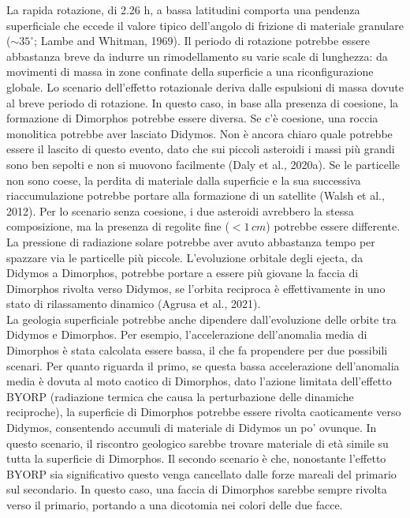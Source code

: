 \documentclass[a4paper,11pt,openright]{book}
\begin{document}
La rapida rotazione, di 2.26 h, a bassa latitudini comporta una pendenza superficiale che eccede il valore tipico dell'angolo di frizione di materiale granulare ($\sim 35^{\circ}$; Lambe and Whitman, 1969). Il periodo di rotazione potrebbe essere abbastanza breve da indurre un rimodellamento su varie scale di lunghezza: da movimenti di massa in zone confinate della superficie a una riconfigurazione globale. Lo scenario dell'effetto rotazionale deriva dalle espulsioni di massa dovute al breve periodo di rotazione. In questo caso, in base alla presenza di coesione, la formazione di Dimorphos potrebbe essere diversa. Se c'è coesione, una roccia monolitica potrebbe aver lasciato Didymos. Non è ancora chiaro quale potrebbe essere il lascito di questo evento, dato che sui piccoli asteroidi i massi più grandi sono ben sepolti e non si muovono facilmente (Daly et al., 2020a). Se le particelle non sono coese, la perdita di materiale dalla superficie e la sua successiva riaccumulazione potrebbe portare alla formazione di un satellite (Walsh et al., 2012). Per lo scenario senza coesione, i due asteroidi avrebbero la stessa composizione, ma la presenza di regolite fine ($<1\,cm$) potrebbe essere differente. La pressione di radiazione solare potrebbe aver avuto abbastanza tempo per spazzare via le particelle più piccole. L'evoluzione orbitale degli ejecta, da Didymos a Dimorphos, potrebbe portare a essere più giovane la faccia di Dimorphos rivolta verso Didymos, se l'orbita reciproca è effettivamente in uno stato di rilassamento dinamico (Agrusa et al., 2021).\\
La geologia superficiale potrebbe anche dipendere dall'evoluzione delle orbite tra Didymos e Dimorphos. Per esempio, l'accelerazione dell'anomalia media di Dimorphos è stata calcolata essere bassa, il che fa propendere per due possibili scenari. Per quanto riguarda il primo, se questa bassa accelerazione dell'anomalia media è dovuta al moto caotico di Dimorphos, dato l'azione limitata dell'effetto BYORP (radiazione termica che causa la perturbazione delle dinamiche reciproche), la superficie di Dimorphos potrebbe essere rivolta caoticamente verso Didymos, consentendo accumuli di materiale di Didymos un po' ovunque. In questo scenario, il riscontro geologico sarebbe trovare materiale di età simile su tutta la superficie di Dimorphos. Il secondo scenario è che, nonostante l'effetto BYORP sia significativo questo venga cancellato dalle forze mareali del primario sul secondario. In questo caso, una faccia di Dimorphos sarebbe sempre rivolta verso il primario, portando a una dicotomia nei colori delle due facce. 
\end{document}
